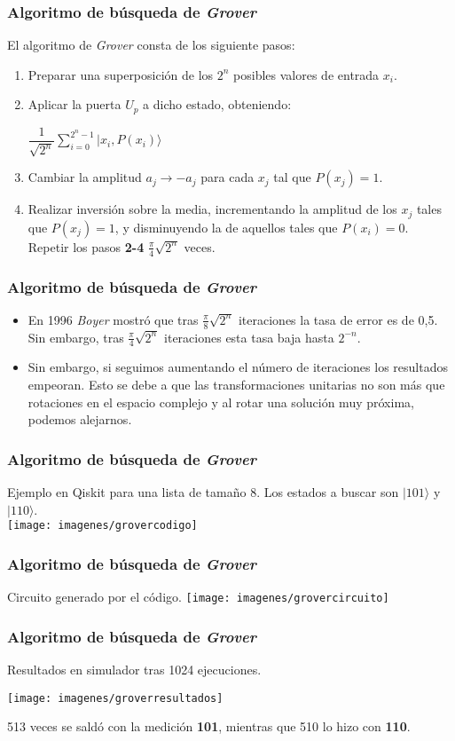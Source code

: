 \documentclass{beamer}
\newcommand{\base}[1]{|#1\rangle}
\begin{document}
\begin{frame}
	\frametitle{Algoritmo de búsqueda de \textit{Grover}}
	El algoritmo de \textit{Grover} consta de los siguiente pasos:
	\begin{enumerate}
	\item Preparar una superposición de los $2^n$ posibles valores de entrada $x_i$.
	\item Aplicar la puerta $U_p$ a dicho estado, obteniendo: 
		\begin{center}
		$\dfrac{1}{\sqrt{2^n}} \sum_{i=0}^{2^n - 1}\base{x_i,P(x_i)}$
		\end{center}
	\item Cambiar la amplitud $a_j \to -a_j$ para cada $x_j$ tal que $P(x_j) = 1$.
	\item Realizar inversión sobre la media, incrementando la amplitud de los $x_j$ tales que $P(x_j) = 1$, y disminuyendo la de aquellos tales que $P(x_i) = 0$. \\
	Repetir los pasos \textbf{2-4} $\frac{\pi}{4}\sqrt{2^n}$ veces.
	\end{enumerate}
\end{frame}

\begin{frame}
	\frametitle{Algoritmo de búsqueda de \textit{Grover}}
	\begin{itemize}
	\item En 1996  \textit{Boyer} mostró que tras $\frac{\pi}{8}\sqrt{2^n}$ iteraciones la tasa de error es de 0,5. Sin embargo, tras $\frac{\pi}{4}\sqrt{2^n}$ iteraciones esta tasa baja hasta $2^{-n}$.
	\item Sin embargo, si seguimos aumentando el número de iteraciones los resultados empeoran. Esto se debe a que las transformaciones unitarias no son más que rotaciones en el espacio complejo y al rotar una solución muy próxima, podemos alejarnos.
	\end{itemize}
\end{frame}

\begin{frame}
	\frametitle{Algoritmo de búsqueda de \textit{Grover}}
	Ejemplo en Qiskit para una lista de tamaño 8. Los estados a buscar son $\base{101}$ y $\base{110}$.\\
	\texttt{[image: imagenes/grovercodigo]}
\end{frame}

\begin{frame}
	\frametitle{Algoritmo de búsqueda de \textit{Grover}}
	Circuito generado por el código.
	\texttt{[image: imagenes/grovercircuito]}
\end{frame}

\begin{frame}
	\frametitle{Algoritmo de búsqueda de \textit{Grover}}
	Resultados en simulador tras 1024 ejecuciones.
	\begin{center}
	\texttt{[image: imagenes/groverresultados]}
	\end{center}
	513 veces se saldó con la medición \textbf{101}, mientras que 510 lo hizo con \textbf{110}.
\end{frame}
\end{document}
